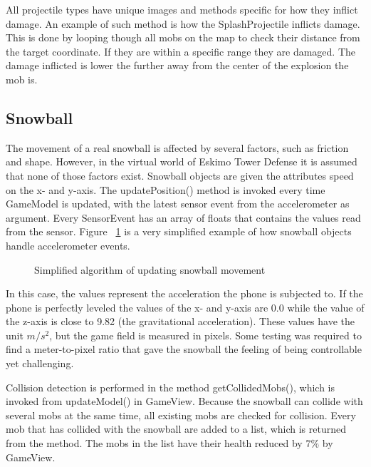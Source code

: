 All projectile types have unique images and methods specific for how they inflict damage. An example of such method is how the SplashProjectile inflicts damage. This is done by looping though all mobs on the map to check their distance from the target coordinate. If they are within a specific range they are damaged. The damage inflicted is lower the further away from the center of the explosion the mob is.

\subsection{Snowball}

The movement of a real snowball is affected by several factors, such as friction and shape. However, in the virtual world of Eskimo Tower Defense it is assumed that none of those factors exist. Snowball objects are given the attributes speed on the x- and y-axis. The updatePosition() method is invoked every time GameModel is updated, with the latest sensor event from the accelerometer as argument. Every SensorEvent has an array of floats that contains the values read from the sensor. Figure ~\ref{fig:codeExUpdatePosition} is a very simplified example of how snowball objects handle accelerometer events.

\begin{figure}[htb]

\begin{small}

\end{small}

\caption{Simplified algorithm of updating snowball movement}
\label{fig:codeExUpdatePosition}

\end{figure}

In this case, the values represent the acceleration the phone is subjected to. If the phone is perfectly leveled the values of the x- and y-axis are 0.0 while the value of the z-axis is close to 9.82 (the gravitational acceleration). These values have the unit \begin{math}m/s^2\end{math}, but the game field is measured in pixels. Some testing was required to find a meter-to-pixel ratio that gave the snowball the feeling of being controllable yet challenging.

Collision detection is performed in the method getCollidedMobs(), which is invoked from updateModel() in GameView. Because the snowball can collide with several mobs at the same time, all existing mobs are checked for collision. Every mob that has collided with the snowball are added to a list, which is returned from the method. The mobs in the list have their health reduced by \begin{math}7\%\end{math} by GameView.

